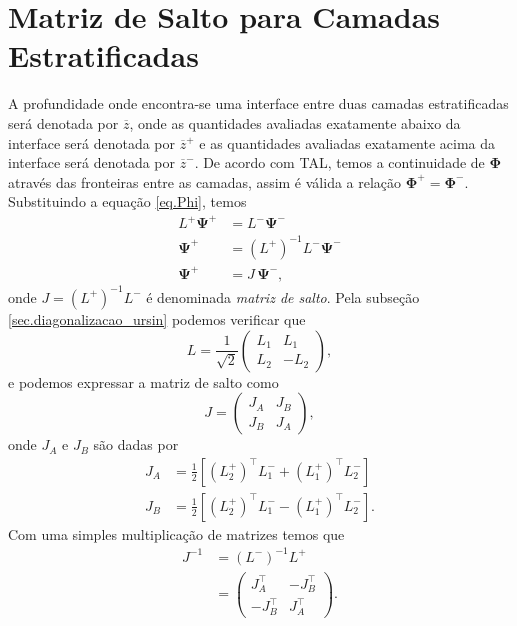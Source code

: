 \section{Matriz de Salto para Camadas Estratificadas}

A profundidade onde encontra-se uma interface entre duas camadas estratificadas ser\'a denotada por $\overline{z}$, onde as quantidades avaliadas exatamente abaixo da interface ser\'a denotada por $\overline{z}^+$ e as quantidades avaliadas exatamente acima da interface ser\'a denotada por $\overline{z}^-$.
De acordo com TAL, temos a continuidade de $\mathbf{\Phi}$ atrav\'es das fronteiras entre as camadas, assim \'e v\'alida a rela\c{c}\~ao $\mathbf{\Phi}^+=\mathbf{\Phi}^-$. Substituindo a equa\c{c}\~ao \ref{eq.Phi}, temos 
\begin{align}\nonumber
L^+\mathbf{\Psi}^+&=L^-\mathbf{\Psi}^-\\\nonumber
\mathbf{\Psi}^+&=(L^+)^{-1}L^-\mathbf{\Psi}^-\\\label{eq.psi_matriz_salto}
\mathbf{\Psi}^+&=J\,\mathbf{\Psi}^-,
\end{align}
onde $J=(L^+)^{-1}L^-$ \'e denominada \textit{matriz de salto}. Pela subse\c{c}\~ao \ref{sec.diagonalizacao_ursin} podemos verificar que
\begin{equation}\label{eq.matriz_L}
L=\frac{1}{\sqrt{2}}
\begin{pmatrix}
L_1&L_1\\
L_2&-L_2
\end{pmatrix},
\end{equation}
e podemos expressar a matriz de salto como
\begin{equation}
J=
\begin{pmatrix}
J_A&J_B\\
J_B&J_A
\end{pmatrix},
\end{equation}
onde $J_A$ e $J_B$ s\~ao dadas por
\begin{align}\label{eq.j_a}
J_A&=\frac{1}{2}\left[(L_2^+)^\top L_1^-+(L_1^+)^\top L_2^-\right]\\\label{eq.j_b}
J_B&=\frac{1}{2}\left[(L_2^+)^\top L_1^--(L_1^+)^\top L_2^-\right].
\end{align}
Com uma simples multiplica\c{c}\~ao de matrizes temos que
\begin{align}\nonumber
J^{-1}&=(L^-)^{-1}L^+\\\label{eq.inversa_matriz_salto}
&=
\begin{pmatrix}
J_A^\top&-J_B^\top\\
-J_B^\top&J_A^\top
\end{pmatrix}.
\end{align}

